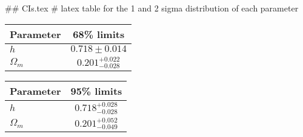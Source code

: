 ## CIs.tex
# latex table for the 1 and 2 sigma distribution of each parameter

\begin{tabular} { l  c}
 Parameter &  68\% limits\\
\hline
{\boldmath$h              $} & $0.718\pm 0.014            $\\
{\boldmath$\Omega_m       $} & $0.201^{+0.022}_{-0.028}   $\\
\hline
\end{tabular}

\begin{tabular} { l  c}
 Parameter &  95\% limits\\
\hline
{\boldmath$h              $} & $0.718^{+0.028}_{-0.028}   $\\
{\boldmath$\Omega_m       $} & $0.201^{+0.052}_{-0.049}   $\\
\hline
\end{tabular}
